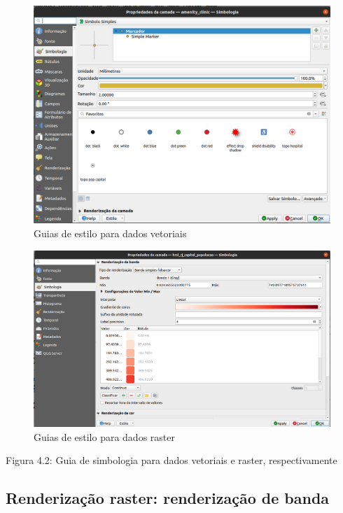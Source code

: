 \documentclass[
]{krantz}
\begin{document}
\begin{figure}
\centering
\includegraphics{media/modulo4/style-vector.png}
\caption{Guias de estilo para dados vetoriais}
\end{figure}

\begin{figure}
\centering
\includegraphics{media/modulo4/style-raster.png}
\caption{Guias de estilo para dados raster}
\end{figure}

Figura 4.2: Guia de simbologia para dados vetoriais e raster, respectivamente

\hypertarget{renderizauxe7uxe3o-raster-renderizauxe7uxe3o-de-banda}{%
\subsection{Renderização raster: renderização de banda}\label{renderizauxe7uxe3o-raster-renderizauxe7uxe3o-de-banda}}
\end{document}

